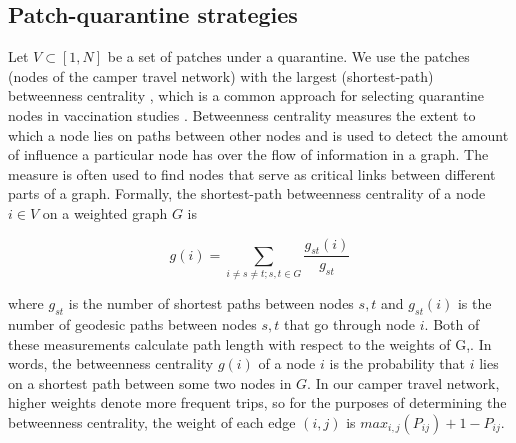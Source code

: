 \subsection{Patch-quarantine strategies}




Let $V \subset [1,N]$ be a set of patches under a quarantine. We use the patches (nodes of the camper travel network) with the largest (shortest-path) betweenness centrality \cite{freeman1977set,brandes2008variants}, which is a common approach for selecting quarantine nodes in vaccination studies \cite{wang2016statistical}. 
Betweenness centrality measures the extent to which a node lies on paths between other nodes and is used to detect the amount of influence a particular node has over the flow of information in a graph. The measure is often used to find nodes that serve as critical links between different parts of a graph. Formally, the shortest-path betweenness centrality of a node $i \in V$ on a weighted graph $G$ is 

$$g(i) = \sum_{i\neq s \neq t ; s,t \in G} \frac {g_{s t}(i)}{g_{s t}}$$

where $g_{st}$ is the number of shortest paths between nodes $s,t$ and $g_{st}(i)$ is the number of geodesic paths between nodes $s,t$ that go through node $i$. Both of these measurements calculate path length with respect to the weights of G,. In words, the betweenness centrality $g(i)$ of a node $i$ is the probability that $i$ lies on a shortest path between some two nodes in $G$. 
In our camper travel network, higher weights denote more frequent trips, so for the purposes of determining the betweenness centrality, the weight of each edge $(i,j)$ is $max_{i,j}(P_{ij}) + 1 - P_{ij}$.



